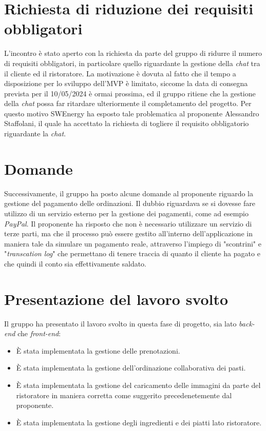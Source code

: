 \section{Richiesta di riduzione dei requisiti obbligatori }
L'incontro è stato aperto con la richiesta da parte del gruppo di ridurre il numero di requisiti obbligatori, in particolare quello riguardante la gestione della \textit{chat} tra il cliente ed il ristoratore.
La motivazione è dovuta al fatto che il tempo a disposizione per lo sviluppo dell'MVP è limitato, siccome la data di consegna prevista per il 10/05/2024 è ormai prossima, ed il gruppo ritiene che la gestione della \textit{chat} possa far ritardare ulteriormente il completamento del progetto.
Per questo motivo SWEnergy ha esposto tale problematica al proponente Alessandro Staffolani, il quale ha accettato la richiesta di togliere il requisito obbligatorio riguardante la \textit{chat}.

\section{Domande}
Successivamente, il gruppo ha posto alcune domande al proponente riguardo la gestione del pagamento delle ordinazioni. 
Il dubbio riguardava se si dovesse fare utilizzo di un servizio esterno per la gestione dei pagamenti, come ad esempio \textit{PayPal}. 
Il proponente ha risposto che non è necessario utilizzare un servizio di terze parti, ma che il processo può essere gestito all'interno dell'applicazione in maniera tale da simulare un pagamento reale, attraverso l'impiego di "scontrini" e "\textit{transcation log}" che permettano di tenere traccia di quanto il cliente ha pagato e che quindi il conto sia effettivamente saldato.  


\section{Presentazione del lavoro svolto}
Il gruppo ha presentato il lavoro svolto in questa fase di progetto, sia lato \textit{back-end} che \textit{front-end}:
\begin{itemize}
    \item È stata implementata la gestione delle prenotazioni.
    \item È stata implementata la gestione dell'ordinazione collaborativa dei pasti.
    \item È stata implementata la gestione del caricamento delle immagini da parte del ristoratore in maniera corretta come suggerito precedenetemente dal proponente.
    \item È stata implementata la gestione degli ingredienti e dei piatti lato ristoratore.
\end{itemize}

